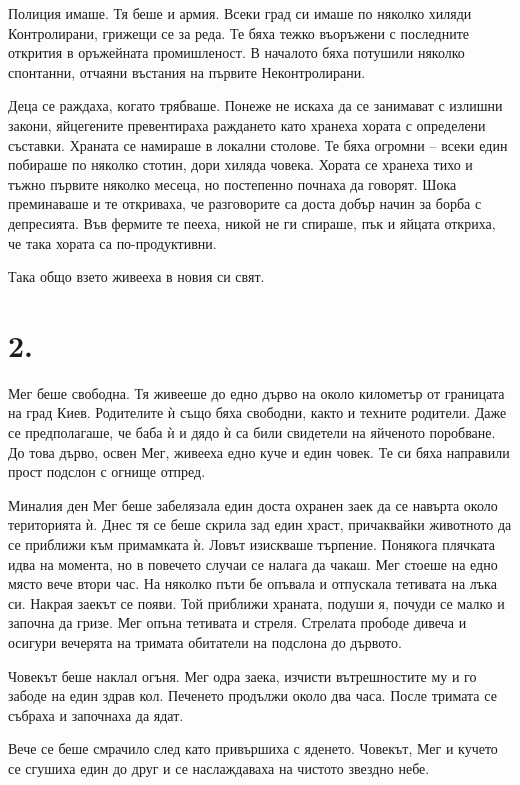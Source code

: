 \documentclass[ebook,openany,12pt]{memoir}
\begin{document}
Полиция имаше. Тя беше и армия. Всеки град си имаше по няколко хиляди Контролирани, грижещи се за реда. Те бяха тежко въоръжени с последните открития в оръжейната промишленост. В началото бяха потушили няколко спонтанни, отчаяни въстания на първите Неконтролирани.

Деца се раждаха, когато трябваше. Понеже не искаха да се занимават с излишни закони, яйцегените превентираха раждането като хранеха хората с определени съставки. Храната се намираше в локални столове. Те бяха огромни – всеки един побираше по няколко стотин, дори хиляда човека. Хората се хранеха тихо и тъжно първите няколко месеца, но постепенно почнаха да говорят. Шока преминаваше и те откриваха, че разговорите са доста добър начин за борба с депресията. Във фермите те пееха, никой не ги спираше, пък и яйцата откриха, че така хората са по-продуктивни.

Така общо взето живееха в новия си свят.

\section*{2.}

Мег беше свободна. Тя живееше до едно дърво на около километър от границата на град Киев. Родителите ѝ също бяха свободни, както и техните родители. Даже се предполагаше, че баба ѝ и дядо ѝ са били свидетели на яйченото поробване. До това дърво, освен Мег, живееха едно куче и един човек. Те си бяха направили прост подслон с огнище отпред.

Миналия ден Мег беше забелязала един доста охранен заек да се навърта около територията ѝ. Днес тя се беше скрила зад един храст, причаквайки животното да се приближи към примамката ѝ. Ловът изискваше търпение. Понякога плячката идва на момента, но в повечето случаи се налага да чакаш. Мег стоеше на едно място вече втори час. На няколко пъти бе опъвала и отпускала тетивата на лъка си. Накрая заекът се появи. Той приближи храната, подуши я, почуди се малко и започна да гризе. Мег опъна тетивата и стреля. Стрелата прободе дивеча и осигури вечерята на тримата обитатели на подслона до дървото.

Човекът беше наклал огъня. Мег одра заека, изчисти вътрешностите му и го забоде на един здрав кол. Печенето продължи около два часа. После тримата се събраха и започнаха да ядат.

Вече се беше смрачило след като привършиха с яденето. Човекът, Мег и кучето се сгушиха един до друг и се наслаждаваха на чистото звездно небе.
\end{document}
